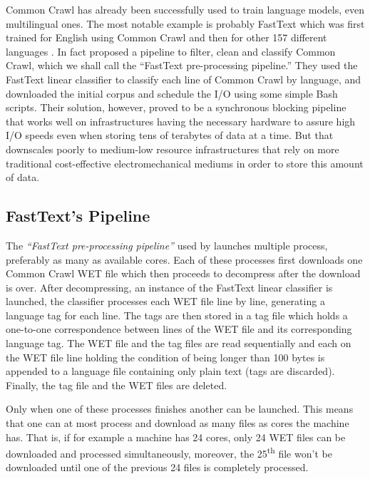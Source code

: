 Common Crawl has already been successfully used to train language models, even multilingual ones. The most notable example is probably FastText which was first trained for English using Common Crawl \citep{mikolov-etal-2018-advances} and then for other 157 different languages \citep{grave-etal-2018-learning}. In fact \citet{grave-etal-2018-learning} proposed a pipeline to filter, clean and classify Common Crawl, which we shall call the ``FastText pre-processing pipeline.'' They used the FastText linear classifier \citep{joulin-etal-2016-fasttext, joulin-etal-2017-bag} to classify each line of Common Crawl by language, and downloaded the initial corpus and schedule the I/O using some simple Bash scripts. Their solution, however, proved to be a synchronous blocking pipeline that works well on infrastructures having the necessary hardware to assure high I/O speeds even when storing tens of terabytes of data at a time. But that downscales poorly to medium-low resource infrastructures that rely on more traditional cost-effective electromechanical mediums in order to store this amount of data.

\subsection{FastText's Pipeline}

The \emph{``FastText pre-processing pipeline''} used by \citet{grave-etal-2018-learning} launches multiple process, preferably as many as available cores. Each of these processes first downloads one Common Crawl WET file which then proceeds to decompress after the download is over. After decompressing, an instance of the FastText linear classifier \citep{joulin-etal-2016-fasttext, joulin-etal-2017-bag} is launched, the classifier processes each WET file line by line, generating a language tag for each line. The tags are then stored in a tag file which holds a one-to-one correspondence between lines of the WET file and its corresponding language tag. The WET file and the tag files are read sequentially and each on the WET file line holding the condition of being longer than 100 bytes is appended to a language file containing only plain text (tags are discarded). Finally, the tag file and the WET files are deleted.

Only when one of these processes finishes another can be launched. This means that one can at most process and download as many files as cores the machine has. That is, if for example a machine has 24 cores, only 24 WET files can be downloaded and processed simultaneously, moreover, the 25\textsuperscript{th} file won't be downloaded until one of the previous 24 files is completely processed.

